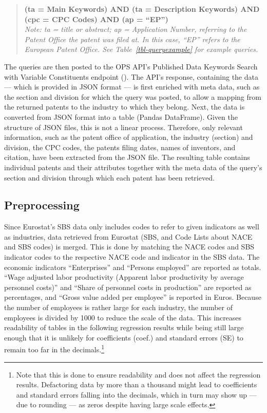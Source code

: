 \documentclass[
  12pt,
  a4paperpaper,
]{article}
\begin{document}

\begin{quote}
\textbf{(ta = Main Keywords) AND (ta = Description Keywords) AND (cpc =
CPC Codes) AND (ap = ``EP'')}\\
\emph{Note: ta = title or abstract; ap = Application Number, referring
to the Patent Office the patent was filed at. In this case, ``EP''
refers to the European Patent Office. See Table~\ref{tbl-queryexample}
for example queries.}
\end{quote}


The queries are then posted to the OPS API's Published Data Keywords
Search with Variable Constituents endpoint
(). The API's response, containing the data --- which is
provided in JSON format --- is first enriched with meta data, such as
the section and division for which the query was posted, to allow a
mapping from the returned patents to the industry to which they belong.
Next, the data is converted from JSON format into a table (Pandas
DataFrame). Given the structure of JSON files, this is not a linear
process. Therefore, only relevant information, such as the patent office
of application, the industry (section) and division, the CPC codes, the
patents filing dates, names of inventors, and citation, have been
extracted from the JSON file. The resulting table contains individual
patents and their attributes together with the meta data of the query's
section and division through which each patent has been retrieved.

\subsection{Preprocessing}\label{sec-preprocessing}

Since Eurostat's SBS data only includes codes to refer to given
indicators as well as industries, data retrieved from Eurostat (SBS, and
Code Lists about NACE and SBS codes) is merged. This is done by matching
the NACE codes and SBS indicator codes to the respective NACE code and
indicator in the SBS data. The economic indicators ``Enterprises'' and
``Persons employed'' are reported as totals. ``Wage adjusted labor
productivity (Apparent labor productivity by average personnel costs)''
and ``Share of personnel costs in production'' are reported as
percentages, and ``Gross value added per employee'' is reported in
Euros. Because the number of employees is rather large for each
industry, the number of employees is divided by 1000 to reduce the scale
of the data. This increases readability of tables in the following
regression results while being still large enough that it is unlikely
for coefficients (coef.) and standard errors (SE) to remain too far in
the decimals.\footnote{Note that this is done to ensure readability and
  does not affect the regression results. Defactoring data by more than
  a thousand might lead to coefficients and standard errors falling into
  the decimals, which in turn may show up --- due to rounding --- as
  zeros despite having large scale effects.\label{note3}}
\end{document}
